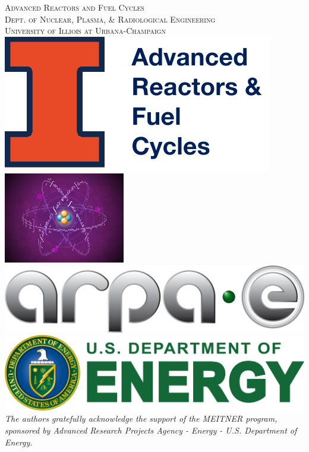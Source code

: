 \documentclass[12pt]{article} %
\begin{document}
\begin{titlepage}
    \textsc{\LARGE Advanced Reactors and Fuel Cycles}\\[0.25cm] %
    
    \textsc{\large Dept. of Nuclear, Plasma, \& Radiological Engineering}\\%
    
    \textsc{\large University of Illiois at Urbana-Champaign}\\ %
    \vspace{0.5cm}
    \includegraphics[scale=0.2]{arfc-smol}
    \includegraphics[scale=0.18]{meitner.png}
    \includegraphics[scale=0.25]{arpa-e.png}
    \includegraphics[scale=0.17]{doe-logo.png}\\[1cm] %
    \textit{The authors gratefully acknowledge the support of the MEITNER program, sponsored by Advanced Research Projects Agency - Energy - U.S. Department of Energy.}  

\end{titlepage}
\end{document}
